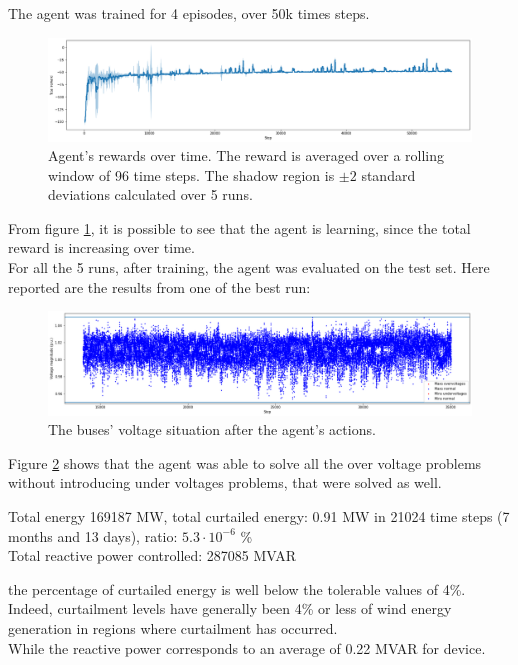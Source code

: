 \noindent The agent was trained for 4 episodes, over 50k times steps.
\begin{figure}[H]
\centering
    \includegraphics[width=.8\linewidth]{images/MVOberr/RL/RLrewards.png}
    \caption[Agent's rewards]{Agent's rewards over time. The reward is averaged over a rolling window of 96 time steps. The shadow region is $\pm2$ standard deviations calculated over 5 runs.}
    \label{im:4_rewards}
\end{figure}
\noindent From figure \ref{im:4_rewards}, it is possible to see that the agent is learning, since the total reward is increasing over time.\\

For all the 5 runs, after training, the agent was evaluated on the test set. Here reported are the results from one of the best run:
\begin{figure}[h]
\centering
    \includegraphics[width=0.9\linewidth]{images/MVOberr/RL/CritialSituationsAfter.png}
    \caption[Agent's solution to voltage problems]{The buses' voltage situation after the agent's actions.}
    \label{im:4_prosolv}
\end{figure}
\noindent Figure \ref{im:4_prosolv} shows that the agent was able to solve all the over voltage problems without introducing under voltages problems, that were solved as well.

\begin{algorithm}[h]
    \STATE Total energy 169187 MW, total curtailed energy: 0.91 MW in 21024 time steps (7 months and 13 days), ratio: $5.3 \cdot 10^{-6}$ \%\\
    
    \STATE Total reactive power controlled: 287085 M\gls{VAR}
\end{algorithm}
\noindent the percentage of curtailed energy is well below the tolerable values of 4\%. Indeed, curtailment levels have generally been 4\% or less of wind energy generation in regions where curtailment has occurred.\\
While the reactive power corresponds to an average of 0.22 M\gls{VAR} for device.\\

